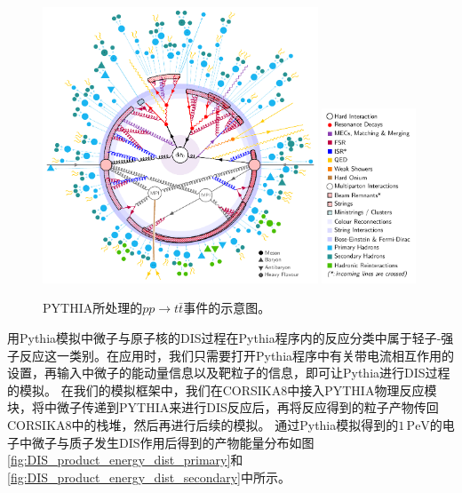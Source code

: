 \begin{figure}[htb]
\centering
    \includegraphics[width=0.73\textwidth]{img/event_generator_schem_fig.pdf}
    \includegraphics[width=0.25\textwidth]{img/event_generator_schem_legend.pdf}
    \caption{\textsf{PYTHIA}所处理的$pp\to t\bar{t}$事件的示意图。}
    \label{fig:event_generator_schem}
\end{figure}

用Pythia模拟中微子与原子核的DIS过程在Pythia程序内的反应分类中属于轻子-强子反应这一类别。在应用时，我们只需要打开Pythia程序中有关带电流相互作用的设置，再输入中微子的能动量信息以及靶粒子的信息，即可让Pythia进行DIS过程的模拟。
在我们的模拟框架中，我们在\textsf{CORSIKA8}中接入\textsf{PYTHIA}物理反应模块，将中微子传递到\textsf{PYTHIA}来进行DIS反应后，再将反应得到的粒子产物传回\textsf{CORSIKA8}中的栈堆，然后再进行后续的模拟。
通过Pythia模拟得到的$1\,\mathrm{PeV}$的电子中微子与质子发生DIS作用后得到的产物能量分布如图\ref{fig:DIS_product_energy_dist_primary}和\ref{fig:DIS_product_energy_dist_secondary}中所示。


